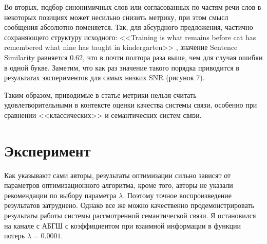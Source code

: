 \documentclass[a4paper,12pt]{article}
\begin{document}
	Во вторых, подбор синонимичных слов или согласованных по частям речи слов в некоторых позициях может несильно снизить метрику, при этом смысл сообщения абсолютно поменяется. Так, для абсурдного предложения, частично сохраняющего структуру исходного: <<Training is what remains before cat has remembered what nine has taught in kindergarten>> , значение Sentence Similarity равняется 0.62, что в почти полтора раза выше, чем для случая ошибки в одной букве. Заметим, что как раз значение такого порядка приводится в результатах экспериментов для самых низких SNR \cite{xie2021sem} (рисунок 7). 
	
	Таким образом, приводимые в статье \cite{xie2021sem} метрики нельзя считать удовлетворительными в контексте оценки качества системы связи, особенно при сравнении <<классических>> и семантических систем связи.
	
	
	\section*{Эксперимент}
	
	
	Как указывают сами авторы, результаты оптимизации сильно зависят от параметров оптимизационного алгоритма, кроме того, авторы не указали рекомендации по выбору параметра $\lambda$. Поэтому точное воспроизведение результатов затруднено. Однако все же можно качественно продемонстрировать результаты работы системы рассмотренной семантической связи. Я остановился на канале с АБГШ с коэффициентом при взаимной информации в функции потерь $\lambda = 0.0001$. 
	
\end{document}
